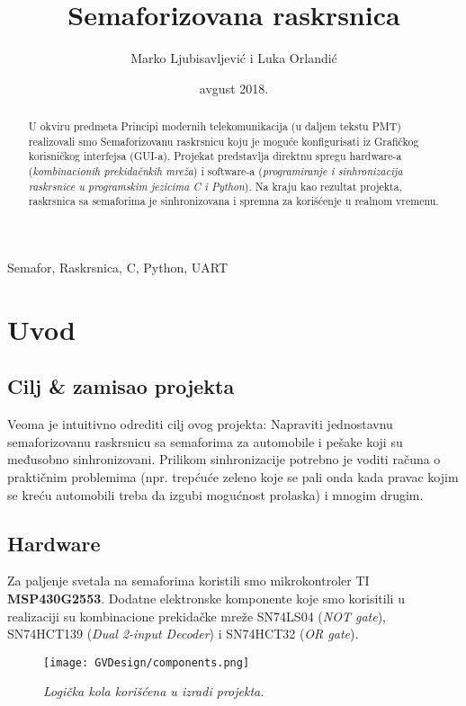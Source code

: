 \documentclass[a4paper,12pt, projekat]{etf}
\title{Semaforizovana raskrsnica}
\author{Marko Ljubisavljević i Luka Orlandić}
\date{avgust 2018.}
\begin{document}
    \maketitle
    \begin{abstract}
    	U okviru predmeta Principi modernih telekomunikacija (u daljem tekstu PMT) realizovali smo Semaforizovanu raskrsnicu koju je moguće konfigurisati iz Grafičkog korisničkog interfejsa (GUI-a). Projekat predstavlja direktnu spregu hardware-a (\textit{kombinacionih prekidačnkih mreža}) i software-a (\textit{programiranje i sinhronizacija raskrsnice u programskim jezicima C i Python}). Na kraju kao rezultat projekta, raskrsnica sa semaforima je sinhronizovana i spremna za korišćenje u realnom vremenu. 
    \end{abstract}
    \begin{keywords}
        Semafor, Raskrsnica, C, Python, UART
    \end{keywords}
   \tableofcontents
   \listoffigures
    
\chapter{Uvod}

\section{Cilj \& zamisao projekta}
Veoma je intuitivno odrediti cilj ovog projekta: Napraviti jednostavnu semaforizovanu raskrsnicu sa semaforima za automobile i pešake koji su međusobno sinhronizovani. Prilikom sinhronizacije potrebno je voditi računa o praktičnim problemima (npr. trepćuće zeleno koje se pali onda kada pravac kojim se kreću automobili treba da izgubi mogućnost prolaska) i mnogim drugim.

\section{Hardware}
Za paljenje svetala na semaforima koristili smo mikrokontroler TI \textbf{MSP430G2553}. Dodatne elektronske komponente koje smo korisitili u realizaciji su kombinacione prekidačke mreže SN74LS04 (\textit{NOT gate}), SN74HCT139 (\textit{Dual 2-input Decoder}) i SN74HCT32 (\textit{OR gate}).

\begin{figure}[!htb]
\centering
\texttt{[image: GVDesign/components.png]}
\caption{\textit{Logička kola korišćena u izradi projekta.}}
\label{fig:logicgates}
\end{figure}
\end{document}
